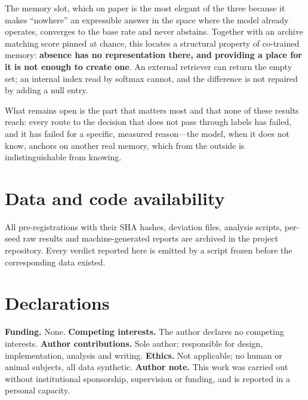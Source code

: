 \documentclass[11pt,a4paper]{article}
\begin{document}
The memory slot, which on paper is the most elegant of the three because it makes ``nowhere'' an
expressible answer in the space where the model already operates, converges to the base rate and
never abstains. Together with an archive matching score pinned at chance, this locates a structural
property of co-trained memory: \textbf{absence has no representation there, and providing a place
for it is not enough to create one}. An external retriever can return the empty set; an internal
index read by softmax cannot, and the difference is not repaired by adding a null entry.

What remains open is the part that matters most and that none of these results reach: every route to
the decision that does not pass through labels has failed, and it has failed for a specific,
measured reason---the model, when it does not know, anchors on another real memory, which from the
outside is indistinguishable from knowing.

\section*{Data and code availability}

All pre-registrations with their SHA hashes, deviation files, analysis scripts, per-seed raw results
and machine-generated reports are archived in the project repository. Every verdict reported here is
emitted by a script frozen before the corresponding data existed.

\section*{Declarations}

\textbf{Funding.} None. \textbf{Competing interests.} The author declares no competing interests.
\textbf{Author contributions.} Sole author; responsible for design, implementation, analysis and
writing. \textbf{Ethics.} Not applicable; no human or animal subjects, all data synthetic.
\textbf{Author note.} This work was carried out without institutional sponsorship, supervision or
funding, and is reported in a personal capacity.
\end{document}
